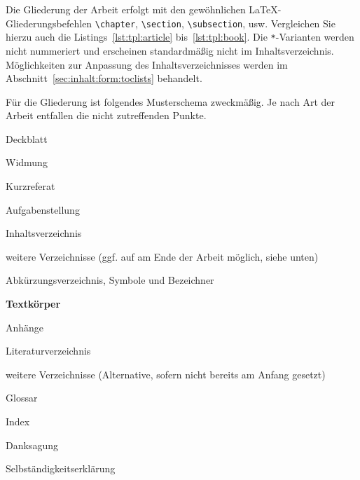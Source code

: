 Die Gliederung der Arbeit erfolgt mit den gewöhnlichen
\LaTeX-Gliederungsbefehlen \verb+\chapter+, \verb+\section+,
\verb+\subsection+, usw. Vergleichen Sie hierzu auch die
Listings~\ref{lst:tpl:article} bis~\ref{lst:tpl:book}. Die \texttt{*}-Varianten
werden nicht nummeriert und erscheinen standardmäßig nicht im
Inhaltsverzeichnis. Möglichkeiten zur Anpassung des Inhaltsverzeichnisses
werden im Abschnitt~\ref{sec:inhalt:form:toclists} behandelt.

Für die Gliederung ist folgendes Musterschema zweckmäßig. Je nach Art der
Arbeit entfallen die nicht zutreffenden Punkte.

\begin{compactitem}
\item Deckblatt
\item Widmung
\item Kurzreferat
\item Aufgabenstellung
\item Inhaltsverzeichnis
\item weitere Verzeichnisse
      (ggf. auf am Ende der Arbeit möglich, siehe unten)
\item Abkürzungsverzeichnis, Symbole und Bezeichner
\item \textbf{Textkörper}
\item Anhänge
\item Literaturverzeichnis
\item weitere Verzeichnisse
      (Alternative, sofern nicht bereits am Anfang gesetzt)
\item Glossar
\item Index
\item Danksagung
\item Selbständigkeitserklärung
\end{compactitem}
